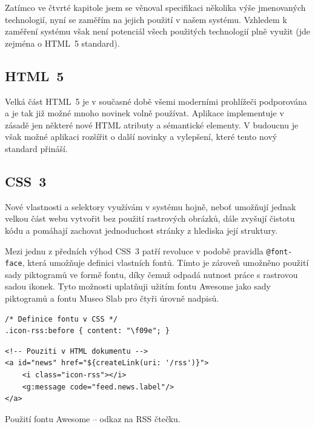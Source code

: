 Zatímco ve čtvrté kapitole jsem se věnoval specifikaci několika výše jmenovaných technologií, nyní se zaměřím na jejich použití v našem systému. Vzhledem k zaměření systému však není potenciál všech použitých technologií plně využit (jde zejména o HTML~5 standard).


\subsection{HTML~5}

Velká část HTML~5 je v současné době všemi moderními prohlížeči podporována a je tak již možné mnoho novinek volně používat. Aplikace implementuje v zásadě jen některé nové HTML atributy a sémantické elementy. V budoucnu je však možné aplikaci rozšířit o další novinky a vylepšení, které tento nový standard přináší.

\subsection{CSS~3}

Nové vlastnosti a selektory využívám v systému hojně, neboť umožňují jednak velkou část webu vytvořit bez použití rastrových obrázků, dále zvyšují čistotu kódu a pomáhají zachovat jednoduchost stránky z hlediska její struktury.

Mezi jednu z předních výhod CSS~3 patří revoluce v podobě pravidla \texttt{@font-face}, která umožňuje definici vlastních fontů. Tímto je zároveň umožněno použití sady piktogramů ve formě fontu, díky čemuž odpadá nutnost práce s rastrovou sadou ikonek. Tyto možnosti uplatňuji užitím fontu Awesome jako sady piktogramů a fontu Museo Slab pro čtyři úrovně nadpisů.

\begin{example}
    \centering
    \begin{lstlisting}
/* Definice fontu v CSS */
.icon-rss:before { content: "\f09e"; }
    \end{lstlisting}
    \begin{lstlisting}
<!-- Pouziti v HTML dokumentu -->
<a id="news" href="${createLink(uri: '/rss')}">
    <i class="icon-rss"></i>
    <g:message code="feed.news.label"/>
</a>
    \end{lstlisting}
    \caption{Použití fontu Awesome -- odkaz na RSS čtečku.}
    \label{example:awesome}
\end{example}

